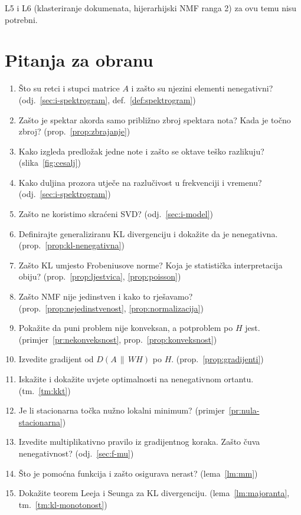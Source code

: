 \documentclass[11pt,a4paper]{article}
\theoremstyle{definition}
\theoremstyle{plain}
\theoremstyle{remark}
\newcommand{\Dkl}[2]{D(#1\,\|\,#2)}
\begin{document}
L5 i L6 (klasteriranje dokumenata, hijerarhijski NMF ranga 2) za ovu temu nisu potrebni.

\section{Pitanja za obranu}\label{sec:pitanja}

\begin{enumerate}
\item Što su retci i stupci matrice $A$ i zašto su njezini elementi nenegativni?
  (odj.~\ref{sec:i-spektrogram}, def.~\ref{def:spektrogram})
\item Zašto je spektar akorda samo približno zbroj spektara nota? Kada je točno zbroj?
  (prop.~\ref{prop:zbrajanje})
\item Kako izgleda predložak jedne note i zašto se oktave teško razlikuju? (slika~\ref{fig:cesalj})
\item Kako duljina prozora utječe na razlučivost u frekvenciji i vremenu? (odj.~\ref{sec:i-spektrogram})
\item Zašto ne koristimo skraćeni SVD? (odj.~\ref{sec:i-model})
\item Definirajte generaliziranu KL divergenciju i dokažite da je nenegativna.
  (prop.~\ref{prop:kl-nenegativna})
\item Zašto KL umjesto Frobeniusove norme? Koja je statistička interpretacija obiju?
  (prop.~\ref{prop:ljestvica}, \ref{prop:poisson})
\item Zašto NMF nije jedinstven i kako to rješavamo? (prop.~\ref{prop:nejedinstvenost},
  \ref{prop:normalizacija})
\item Pokažite da puni problem nije konveksan, a potproblem po $H$ jest.
  (primjer~\ref{pr:nekonveksnost}, prop.~\ref{prop:konveksnost})
\item Izvedite gradijent od $\Dkl{A}{WH}$ po $H$. (prop.~\ref{prop:gradijenti})
\item Iskažite i dokažite uvjete optimalnosti na nenegativnom ortantu. (tm.~\ref{tm:kkt})
\item Je li stacionarna točka nužno lokalni minimum? (primjer~\ref{pr:nula-stacionarna})
\item Izvedite multiplikativno pravilo iz gradijentnog koraka. Zašto čuva nenegativnost? (odj.~\ref{sec:f-mu})
\item Što je pomoćna funkcija i zašto osigurava nerast? (lema~\ref{lm:mm})
\item Dokažite teorem Leeja i Seunga za KL divergenciju. (lema~\ref{lm:majoranta},
  tm.~\ref{tm:kl-monotonost})

\end{enumerate}
\end{document}
